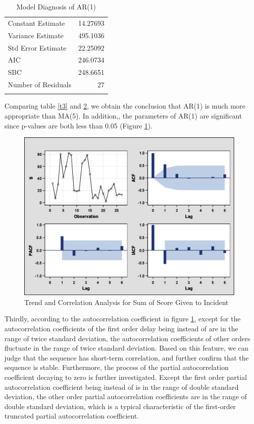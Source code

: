 \begin{table}[H]
\centering
\begin{longtable}{lr}
\toprule
   Constant Estimate &    14.27693\\
   Variance Estimate &    495.1036\\
   Std Error Estimate &    22.25092\\
   AIC &    246.0734\\
   SBC &    248.6651\\
   Number of Residuals &    27\\
\bottomrule
\caption{Model Diagnosis of AR(1)}
\label{t5}
\end{longtable}
\end{table}

Comparing table \ref{t3} and \ref{t5}, we obtain the conclusion that AR(1) is much more appropriate than MA(5). In addition,, the parameters of AR(1) are significant since p-values are both less than 0.05 (Figure \ref{f2}).


\begin{figure}[H]
\centering
\includegraphics[scale=0.25]{Pic/Q1/2.png}
\caption{Trend and Correlation Analysis for Sum of Score Given to Incident}
\label{f2}
\end{figure}

Thirdly, according to the autocorrelation coefficient in figure \ref{f2}, except for the autocorrelation coefficients of the first order delay being instead of are in the range of twice standard deviation, the autocorrelation coefficients of other orders fluctuate in the range of twice standard deviation. Based on this feature, we can judge that the sequence has short-term correlation, and further confirm that the sequence is stable. Furthermore, the process of the partial autocorrelation coefficient decaying to zero is further investigated. Except the first order partial autocorrelation coefficient being instead of is in the range of double standard deviation, the other order partial autocorrelation coefficients are in the range of double standard deviation, which is a typical characteristic of the first-order truncated partial autocorrelation coefficient.

